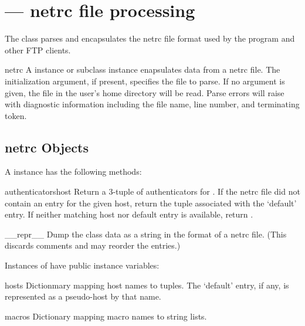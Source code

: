 \section{ ---
         netrc file processing}




The  class parses and encapsulates the netrc file format
used by the \UNIX{}  program and other FTP clients.

\begin{classdesc}{netrc}{}
A  instance or subclass instance enapsulates data from 
a netrc file.  The initialization argument, if present, specifies the
file to parse.  If no argument is given, the file  in the
user's home directory will be read.  Parse errors will raise
 with diagnostic information including the file 
name, line number, and terminating token.
\end{classdesc}


\subsection{netrc Objects \label{netrc-objects}}

A  instance has the following methods:

\begin{methoddesc}{authenticators}{host}
Return a 3-tuple 
of authenticators for .  If the netrc file did not
contain an entry for the given host, return the tuple associated with
the `default' entry.  If neither matching host nor default entry is
available, return .
\end{methoddesc}

\begin{methoddesc}{__repr__}{}
Dump the class data as a string in the format of a netrc file.
(This discards comments and may reorder the entries.)
\end{methoddesc}

Instances of  have public instance variables:

\begin{memberdesc}{hosts}
Dictionmary mapping host names to  tuples.  The `default' entry, if any, is represented
as a pseudo-host by that name.
\end{memberdesc}

\begin{memberdesc}{macros}
Dictionary mapping macro names to string lists.
\end{memberdesc}
